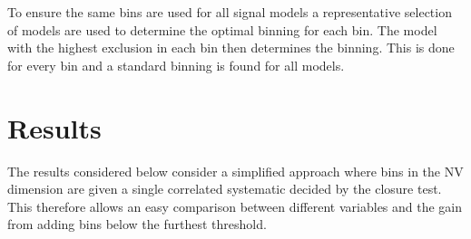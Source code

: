 To ensure the same bins are used for all signal models a representative selection of models are used to determine the optimal binning for each \scalhtcat bin. The model with the highest exclusion in each bin then determines the binning. This is done for every \scalhtcat bin and a standard binning is found for all models.

\section{Results}

The results considered below consider a simplified approach where bins in the NV dimension are given a single correlated systematic decided by the closure test. This therefore allows an easy comparison between different variables and the gain from adding bins below the furthest threshold.







